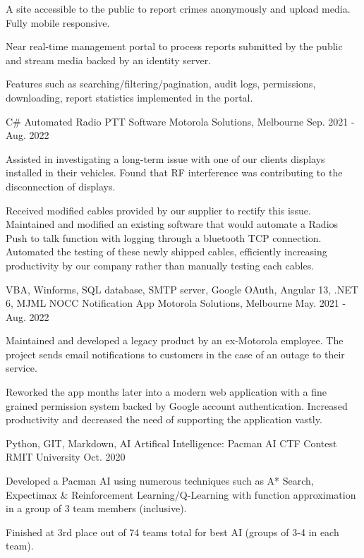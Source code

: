 \begin{cventries}
{\begin{cvitems}
        \item {A site accessible to the public to report crimes anonymously and upload media. Fully mobile responsive.}
        \item {Near real-time management portal to process reports submitted by the public and stream media backed by an identity server.}
        \item {Features such as searching/filtering/pagination, audit logs, permissions, downloading, report statistics implemented in the portal.}
      \end{cvitems}
    }
  \cventry
    {C\#}
    {Automated Radio PTT Software}
    {Motorola Solutions, Melbourne}
    {Sep. 2021 - Aug. 2022}
    {
      \begin{cvitems}
        \item {Assisted in investigating a long-term issue with one of our clients displays installed in their vehicles. Found that RF interference was contributing to the disconnection of displays.}
        \item {Received modified cables provided by our supplier to rectify this issue. Maintained and modified an existing software that would automate a Radios Push to talk function with logging through a bluetooth TCP connection. Automated the testing of these newly shipped cables, efficiently increasing productivity by our company rather than manually testing each cables.}
      \end{cvitems}
    }
  \cventry
    {VBA, Winforms, SQL database, SMTP server, Google OAuth, Angular 13, .NET 6, MJML}
    {NOCC Notification App}
    {Motorola Solutions, Melbourne}
    {May. 2021 - Aug. 2022}
    {
      \begin{cvitems}
        \item {Maintained and developed a legacy product by an ex-Motorola employee. The project sends email notifications to customers in the case of an outage to their service.}
        \item {Reworked the app months later into a modern web application with a fine grained permission system backed by Google account authentication. Increased productivity and decreased the need of supporting the application vastly.}
      \end{cvitems}
    }
  \cventry
    {Python, GIT, Markdown, AI}
    {Artifical Intelligence: Pacman AI CTF Contest}
    {RMIT University}
    {Oct. 2020}
    {
      \begin{cvitems}
        \item {Developed a Pacman AI using numerous techniques such as A* Search, Expectimax \& Reinforcement Learning/Q-Learning with function approximation in a group of 3 team members (inclusive).}
        \item {Finished at 3rd place out of 74 teams total for best AI (groups of 3-4 in each team).}
      \end{cvitems}
    }
\end{cventries}
